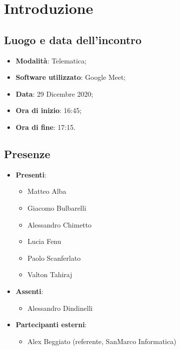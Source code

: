 \documentclass[]{article}
\begin{document}
	

	\newpage


	\section{Introduzione}
		\subsection{Luogo e data dell'incontro}
		\begin{itemize}
			\item \textbf{Modalità}: Telematica;
			\item \textbf{Software utilizzato}: Google Meet;
			\item \textbf{Data}: 29 Dicembre 2020;
			\item \textbf{Ora di inizio}: 16:45;
			\item \textbf{Ora di fine}: 17:15.
		\end{itemize}

		\subsection{Presenze}
		\begin{itemize}
			\item \textbf{Presenti}:
			\begin{itemize}
				\item Matteo Alba
				\item Giacomo Bulbarelli
				\item Alessandro Chimetto
				\item Lucia Fenu
				\item Paolo Scanferlato
				\item Valton Tahiraj
			\end{itemize}
			\item \textbf{Assenti}:
			\begin{itemize}
				\item Alessandro Dindinelli
			\end{itemize}
			\item \textbf{Partecipanti esterni}:
			\begin{itemize}
				\item Alex Beggiato (referente, SanMarco Informatica)
			\end{itemize}
		\end{itemize}
\end{document}
